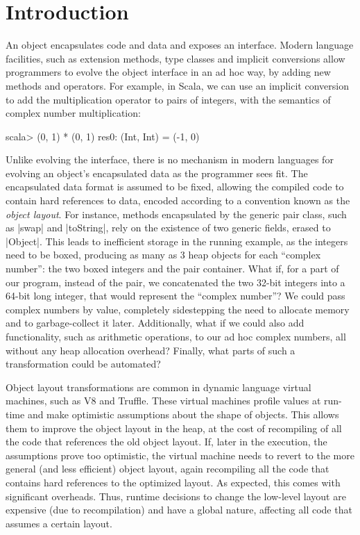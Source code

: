 \section{Introduction}
\label{sec:intro}

An object encapsulates code and data and exposes an interface. Modern
language facilities, such as extension methods, type classes and
implicit conversions allow programmers to evolve the object interface
in an ad hoc way, by adding new methods and operators. For example, in
Scala, we can use an implicit conversion to add the multiplication
operator to pairs of integers, with the semantics of complex number
multiplication:

\begin{lstlisting-nobreak}
scala> (0, 1) * (0, 1)
res0: (Int, Int) = (-1, 0)
\end{lstlisting-nobreak}

Unlike evolving the interface, there is no mechanism in modern
languages for evolving an object's encapsulated data as the programmer sees fit. The
encapsulated data format is assumed to be fixed, allowing the compiled
code to contain hard references to data, encoded according to a convention known as the
\emph{object layout}. For instance, methods encapsulated
by the generic pair class, such as |swap| and |toString|, rely on the
existence of two generic fields, erased to |Object|. This leads to
inefficient storage in the running example, as the integers need to be boxed, producing as many as
3 heap objects for each ``complex number'': the two boxed integers and
the pair container. What if, for a part of  our program, instead of the pair, we
concatenated the two 32-bit integers into a 64-bit long integer, that
would represent the ``complex number''? We could pass complex numbers by value,
completely sidestepping the need to allocate memory and to garbage-collect it
later. Additionally, what if we could also add
functionality, such as arithmetic operations, to our ad hoc complex
numbers, all without any heap allocation overhead? Finally, what parts of such a
transformation could be automated? %

Object layout transformations are common in dynamic language virtual
machines, such as V8 and Truffle. These virtual machines profile
values at run-time and make optimistic assumptions about the shape of
objects. This allows them to improve the object layout
in the heap, at the cost of recompiling of all the code that references
the old object layout.
If, later in the execution, the assumptions prove too optimistic, the
virtual machine needs to revert to the more general (and less
efficient) object layout, again recompiling all the code that contains
hard references to the optimized layout. As expected, this comes with
significant overheads. Thus, runtime decisions to change the
low-level layout are expensive (due to recompilation) and
have a global nature, affecting all code that assumes a certain layout.

